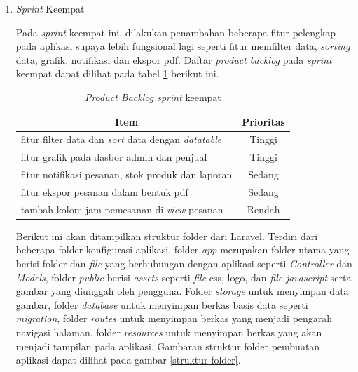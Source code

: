 \begin{enumerate}
	\item \textit{Sprint} Keempat
	\par Pada \textit{sprint} keempat ini, dilakukan penambahan beberapa fitur pelengkap pada aplikasi supaya lebih fungsional lagi seperti fitur memfilter data, \textit{sorting} data, grafik, notifikasi dan ekspor pdf. Daftar \textit{product backlog} pada \textit{sprint} keempat dapat dilihat pada tabel \ref*{tab:sprint keempat} berikut ini.

	\begin{table}[H]
		\begin{center}
		\caption{\textit{Product Backlog sprint} keempat}
		\label{tab:sprint keempat}
		\begin{tabular}{|l|c|}
		\hline
		\multicolumn{1}{|c|}{Item} & Prioritas\\
		\hline
		fitur filter data dan \textit{sort} data dengan \textit{datatable} & Tinggi\\
		\hline
		fitur grafik pada dasbor admin dan penjual & Tinggi\\
		\hline
		fitur notifikasi pesanan, stok produk dan laporan & Sedang\\
		\hline
		fitur ekspor pesanan dalam bentuk pdf & Sedang\\
		\hline
		tambah kolom jam pemesanan di \textit{view} pesanan & Rendah\\
		\hline
		\end{tabular}
		\end{center}
	\end{table}

	\par Berikut ini akan ditampilkan struktur folder dari Laravel. Terdiri dari beberapa folder konfigurasi aplikasi, folder \textit{app} merupakan folder utama yang berisi folder dan \textit{file} yang berhubungan dengan aplikasi seperti \textit{Controller} dan \textit{Models}, folder \textit{public} berisi \textit{assets} seperti \textit{file} css, logo, dan \textit{file} \textit{javascript} serta gambar yang diunggah oleh pengguna. Folder \textit{storage} untuk menyimpan data gambar, folder \textit{database} untuk menyimpan berkas basis data seperti \textit{migration}, folder \textit{routes} untuk menyimpan berkas yang menjadi pengarah navigasi halaman, folder \textit{resources} untuk menyimpan berkas yang akan menjadi tampilan pada aplikasi. Gambaran struktur folder pembuatan aplikasi dapat dilihat pada gambar \ref*{struktur folder}.


\end{enumerate}
